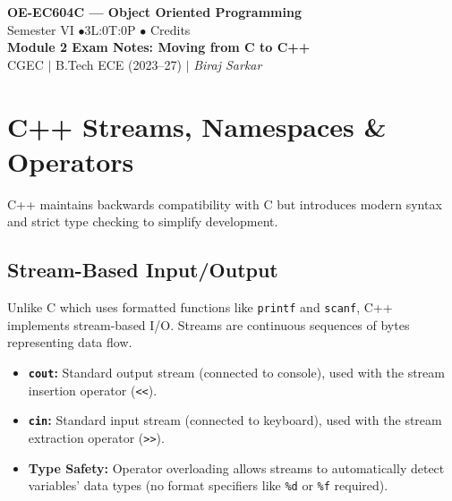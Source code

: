 \documentclass[12pt,a4paper]{article}
\begin{document}

\begin{center}
  {\LARGE\bfseries\color{myred} OE-EC604C --- Object Oriented Programming}\\[5pt]
  {\normalsize\color{mydark} Semester VI \quad$\bullet$\quad 3L:0T:0P \quad$\bullet$ Credits}\\[3pt]
  {\normalsize\color{myteal}\textbf{Module 2 Exam Notes: Moving from C to C++}}\\[3pt]
  {\small\color{mydark} CGEC \;$|$\; B.Tech ECE (2023--27) \;$|$\; \textit{Biraj Sarkar}}
\end{center}
\vspace{2pt}
\noindent{\color{myred}\rule{\linewidth}{1.5pt}}
\vspace{2pt}

\hypersetup{linkcolor=mydark}
\tableofcontents
\hypersetup{linkcolor=myteal}
\newpage

\section{C++ Streams, Namespaces \& Operators}

C++ maintains backwards compatibility with C but introduces modern syntax and strict type checking to simplify development.

\subsection{Stream-Based Input/Output}
Unlike C which uses formatted functions like \texttt{printf} and \texttt{scanf}, C++ implements stream-based I/O. Streams are continuous sequences of bytes representing data flow.
\begin{itemize}[leftmargin=*, itemsep=3pt]
  \item \textbf{\texttt{cout}:} Standard output stream (connected to console), used with the stream insertion operator (\texttt{<<}).
  \item \textbf{\texttt{cin}:} Standard input stream (connected to keyboard), used with the stream extraction operator (\texttt{>>}).
  \item \textbf{Type Safety:} Operator overloading allows streams to automatically detect variables' data types (no format specifiers like \texttt{\%d} or \texttt{\%f} required).
\end{itemize}
\end{document}
